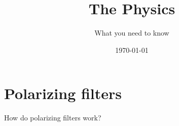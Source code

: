 
\title{The Physics}
\subtitle{What you need to know}

\date{\today}

\begin{frame}
\maketitle
\end{frame}

\section{Polarizing filters}

\begin{frame}{How do polarizing filters work?}

    
\end{frame}